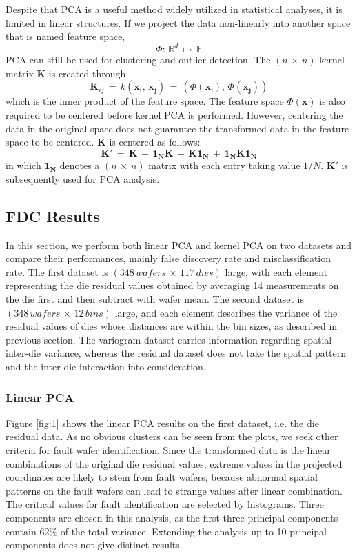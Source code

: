 \documentclass[12pt]{article}
\numberwithin{equation}{section}
\numberwithin{table}{section}
\numberwithin{figure}{section}
\begin{document}
Despite that PCA is a useful method widely utilized in statistical
analyses, it is limited in linear structures. If we project the data
non-linearly into another space that is named feature space, 
\[
\Phi:\,\mathbb{R}^{d}\,\longmapsto\,\mathbb{F}
\]
PCA can still be used for clustering and outlier detection. The $(n\,\times\, n)$
kernel matrix $\mathbf{K}$ is created through
\[
\mathbf{K}_{ij}\,=\, k(\mathbf{x_{i}},\,\mathbf{x_{j}})\,=\,(\Phi(\mathbf{x_{i}}),\,\Phi(\mathbf{x_{j}}))
\]
which is the inner product of the feature space. The feature space
$\Phi(\mathbf{x})$ is also required to be centered before kernel
PCA is performed. However, centering the data in the original space
does not guarantee the transformed data in the feature space to be
centered. $\mathbf{K}$ is centered as follows:
\[
\mathbf{K}'\,=\,\mathbf{K}\,-\,\mathbf{1_{N}K}\,-\,\mathbf{K1_{N}}\,+\,\mathbf{1_{N}K1_{N}}
\]
in which $\mathbf{1_{N}}$ denotes a $(n\,\times\, n)$ matrix with
each entry taking value $1/N$. $\mathbf{K}'$ is subsequently used
for PCA analysis.


\subsection{FDC Results} \label{kernres}
\hspace{12 pt}
In this section, we perform both linear PCA and kernel PCA on two
datasets and compare their performances, mainly false discovery rate
and misclassification rate. The first dataset is $(348\, wafers\,\times\,117\, dies)$
large, with each element representing the die residual values obtained
by averaging 14 measurements on the die first and then subtract with
wafer mean. The second dataset is $(348\, wafers\,\times\,12\, bins)$
large, and each element describes the variance of the residual values
of dies whose distances are within the bin sizes, as described in
previous section. The variogram dataset carries information regarding
spatial inter-die variance, whereas the residual dataset does not
take the spatial pattern and the inter-die interaction into consideration.


\subsubsection{Linear PCA}
\hspace{12 pt}
Figure \ref{fig:1} shows the linear PCA results on the first dataset,
i.e. the die residual data. As no obvious clusters can be seen from
the plots, we seek other criteria for fault wafer identification.
Since the transformed data is the linear combinations of the original
die residual values, extreme values in the projected coordinates are
likely to stem from fault wafers, because abnormal spatial patterns
on the fault wafers can lead to strange values after linear combination.
The critical values for fault identification are selected by histograms.
Three components are chosen in this analysis, as the first three principal
components contain 62\% of the total variance. Extending the analysis
up to 10 principal components does not give distinct results.
\end{document}
